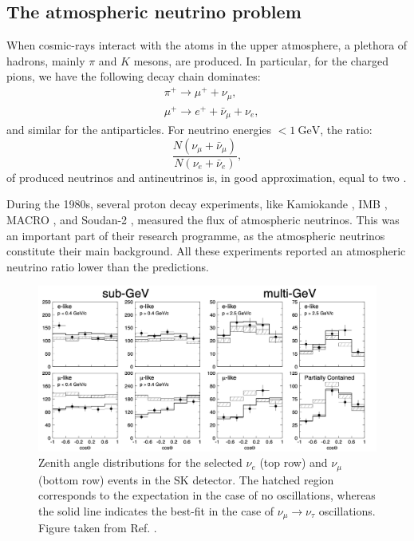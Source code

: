 \subsection{The atmospheric neutrino problem}

When cosmic-rays interact with the atoms in the upper atmosphere, a plethora of hadrons, mainly $\pi$ and $K$ mesons, are produced. In particular, for the charged pions, we have the following decay chain dominates:
\begin{equation}
	\begin{split}
		&\pi^{+} \longrightarrow \mu^{+} + \nu_{\mu},\\
		&\mu^{+} \longrightarrow e^{+} + \bar{\nu}_{\mu} + \nu_{e},
	\end{split}
\end{equation}
and similar for the antiparticles. For neutrino energies $< 1~\mathrm{GeV}$, the ratio:
\begin{equation}
	\frac{N(\nu_{\mu}+\bar{\nu}_{\mu})}{N(\nu_{e}+\bar{\nu}_{e})},
\end{equation}
of produced neutrinos and antineutrinos is, in good approximation, equal to two \cite{Gaisser2002}.

During the 1980s, several proton decay experiments, like Kamiokande \cite{Hirata1988}, IMB \cite{Casper1991}, MACRO \cite{Ambrosio1998}, and Soudan-2 \cite{Allison1997}, measured the flux of atmospheric neutrinos. This was an important part of their research programme, as the atmospheric neutrinos constitute their main background. All these experiments reported an atmospheric neutrino ratio lower than the predictions.

\begin{figure}[t]
	\centering
	\includegraphics[width=.90\linewidth]{Images/Nu/superk_oscillations.png}
	\caption[Zenith angle distributions for the selected $\nu_{e}$ and $\nu_{\mu}$ events in the SK detector.]{Zenith angle distributions for the selected $\nu_{e}$ (top row) and $\nu_{\mu}$ (bottom row) events in the SK detector. The hatched region corresponds to the expectation in the case of no oscillations, whereas the solid line indicates the best-fit in the case of $\nu_{\mu} \rightarrow \nu_{\tau}$ oscillations. Figure taken from Ref. \cite{SuperKamiokande1998}.}
	\label{fig:atmospheric_nu_osc}
\end{figure}

